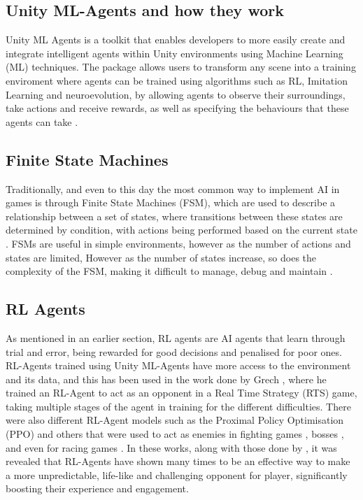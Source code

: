 \begin{spacing}{2.0}

	\section{Unity ML-Agents and how they work}

	Unity ML Agents is a toolkit that enables developers to more easily create and integrate intelligent agents within Unity environments using Machine Learning (ML) techniques.
	The package allows users to transform any scene into a training enviroment where agents can be trained using algorithms such as RL, Imitation Learning and neuroevolution, by allowing agents to observe their surroundings, take actions and receive rewards,
	as well as specifying the behaviours that these agents can take \cite{raut_unity_2024} \cite{unity_ml_agents}.

	\subsection{Finite State Machines}

	Traditionally, and even to this day the most common way to implement AI in games is through Finite State Machines (FSM), which are used to describe a relationship between a set of states, where transitions
	between these states are determined by condition, with actions being performed based on the current state \cite{grech_creating_2023}. FSMs are useful in simple environments, however as the number of actions and states are limited, However
	as the number of states increase, so does the complexity of the FSM, making it difficult to manage, debug and maintain \cite{grech_creating_2023}.

	\subsection{RL Agents}

	As mentioned in an earlier section, RL agents are AI agents that learn through trial and error, being rewarded for good decisions and penalised for poor ones. RL-Agents trained using Unity ML-Agents have more
	access to the environment and its data, and this has been used in the work done by Grech \cite{grech_creating_2023}, where he trained an RL-Agent to act as an opponent in a Real Time Strategy (RTS) game, taking multiple stages of the agent
	in training for the different difficulties. There were also different RL-Agent models such as the Proximal Policy Optimisation (PPO) and others that were used to act as enemies in fighting games \cite{bin_ramlan_implementation_2021}, bosses \cite{metz_evaluation_2020},
	and even for racing games \cite{berta_development_2024}. In these works, along with those done by \cite{borg_investigating_2020} \cite{zhasulanov_enhancing_2024} \cite{raut_unity_2024}, it was revealed that RL-Agents have shown many times to be an effective way to make a more unpredictable, life-like and challenging
	opponent for player, significantly boosting their experience and engagement.


\end{spacing}
